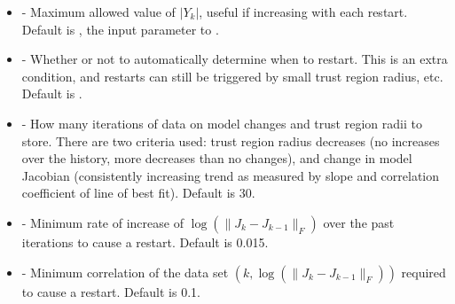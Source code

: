 \documentclass[letterpaper,10pt,english]{sphinxmanual}
\begin{document}
\begin{itemize}
\item {} 
 - Maximum allowed value of \(|Y_k|\), useful if increasing with each restart. Default is , the input parameter to .

\item {} 
 - Whether or not to automatically determine when to restart. This is an extra condition, and restarts can still be triggered by small trust region radius, etc. Default is .

\item {} 
 - How many iterations of data on model changes and trust region radii to store. There are two criteria used: trust region radius decreases (no increases over the history, more decreases than no changes), and change in model Jacobian (consistently increasing trend as measured by slope and correlation coefficient of line of best fit). Default is 30.

\item {} 
 - Minimum rate of increase of \(\log(\|J_k-J_{k-1}\|_F)\) over the past iterations to cause a restart. Default is 0.015.

\item {} 
 - Minimum correlation of the data set \((k, \log(\|J_k-J_{k-1}\|_F))\) required to cause a restart. Default is 0.1.

\end{itemize}
\end{document}
